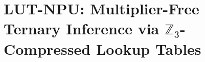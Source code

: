 %

\chapter{LUT-NPU: Multiplier-Free Ternary Inference via \(\mathbb{Z}_3\)-Compressed
         Lookup Tables}%
\label{ch:lut_npu}

